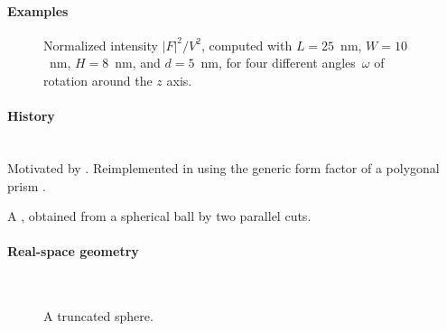 \paragraph{Examples}\strut

\begin{figure}[H]
\begin{center}
\end{center}
\caption{Normalized intensity $|F|^2/V^2$,
computed with $L=25$~nm, $W=10$~nm, $H=8$~nm, and $d=5$~nm,
for four different angles~$\omega$ of rotation around the $z$ axis.}
\end{figure}

\paragraph{History}\strut\\
Motivated by \cite{HeSS74}.
Reimplemented in  using the generic form factor
of a polygonal prism \cite{Wut17}.


\label{STruncatedSphere}

A , obtained from a spherical ball by two parallel cuts.

\paragraph{Real-space geometry}\strut\\

\begin{figure}[H]
\hfill
{}
\hfill
{}
\hfill
{}
\hfill
\caption{A truncated sphere.}
\end{figure}
\FloatBarrier


